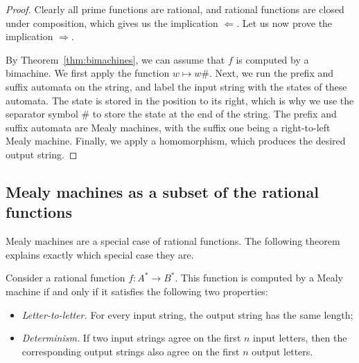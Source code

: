 \begin{proof}
    Clearly all prime functions are rational, and rational functions are closed under composition, which gives us the implication $\Leftarrow$. Let us now prove the implication $\Rightarrow$. 
    
    By Theorem~\ref{thm:bimachines}, we can assume that $f$ is computed by a bimachine.  We first apply the function $w \mapsto w\#$. Next, we run the prefix and suffix automata on the string, and label the input string with the states of these automata. The state is stored in the position to its right, which is why we use the separator symbol $\#$ to store the state at the end of the string. The prefix and suffix automata are Mealy machines, with the suffix one being a right-to-left Mealy machine. Finally, we apply a homomorphism, which produces the desired output string. 
\end{proof}











\subsection{Mealy machines as a subset of the rational functions}
\label{sec:mealy-machines-and-rational-functions}

Mealy machines are a special case of rational functions. The following theorem explains exactly which special case they are. 
\begin{theorem}\label{thm:rational-is-mealy-characterisation}
Consider a rational function $f : A^* \to B^*$. This function is computed by a Mealy machine if and only if it satisfies the following two properties:
\begin{itemize}
    \item \emph{Letter-to-letter.} For every input string, the output string has the same length;
    \item \emph{Determinism.} If two input strings agree on the first $n$ input letters, then the corresponding output strings also agree on the first $n$ output letters.
\end{itemize}
\end{theorem}


\exerciseheader



